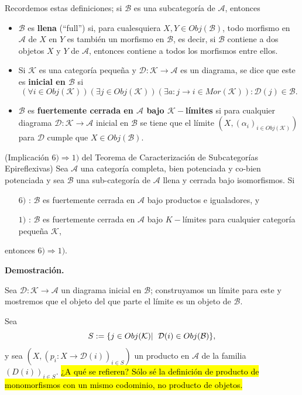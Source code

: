 \documentclass[10pt]{article}
\newtheorem[M]{teo}{Teorema}[section]
\newtheorem[M]{listaObj}[teo]{Lista de deseos}
\newtheorem[M]{preg}[teo]{Pregunta}
\newtheorem[M]{lema}[teo]{Lema}
\newtheorem[M]{hip}[teo]{Hipótesis}
\newtheorem[M]{prop}[teo]{Proposición}
\newtheorem[M]{obs}[teo]{Observación}
\newtheorem[M]{cor}[teo]{Corolario}
\newtheorem[M]{notacion}[teo]{Notación}
\newtheorem[M]{nota}[teo]{Nota}
\begin{document}
Recordemos estas definiciones;
si $\mathcal{B}$ es una
subcategoría de $\mathcal{A}$, entonces
\begin{itemize}
	\item $\mathcal{B}$ es \textbf{llena} (``full'') si, para cualesquiera
	$X, Y \in Obj(\mathcal{B})$, todo morfismo en 
	$\mathcal{A}$ de $X$ en $Y$ es también un morfismo en 
	$\mathcal{B}$, es decir, si $\mathcal{B}$ contiene a dos objetos
	$X$ y $Y$ de $\mathcal{A}$, entonces contiene a todos los morfismos
	entre ellos.
	\item Si $\mathcal{K}$ es una categoría pequeña y 
	$\mathcal{D}: \mathcal{K} \longrightarrow \mathcal{A}$ es un diagrama,
	se dice que este es \textbf{inicial en $\mathcal{B}$} si
	\[
	(\forall i \in Obj(\mathcal{K}))
	(\exists j \in Obj(\mathcal{K}))
	(\exists a: j \longrightarrow i \in Mor(\mathcal{K})):
	\mathcal{D}(j) \in \mathcal{B}.
	\]
	\item $\mathcal{B}$ es \textbf{fuertemente cerrada en 
	$\mathcal{A}$ bajo $\mathcal{K}-$límites} si 
	para cualquier diagrama 
	$\mathcal{D}: \mathcal{K} \longrightarrow \mathcal{A}$	
	inicial en $\mathcal{B}$ se tiene que el límite 
	$(X, (\alpha_{i})_{i \in Obj(\mathcal{K})})$ para 
	$\mathcal{D}$ cumple que $X \in Obj(\mathcal{B})$.
\end{itemize}

\begin{teo}
(Implicación $6) \Rightarrow 1)$ del Teorema de Caracterización de
Subcategorías Epireflexivas) Sea $\mathcal{A}$ una categoría 
completa, bien potenciada y co-bien potenciada y sea 
$\mathcal{B}$ una sub-categoría de $\mathcal{A}$
llena y cerrada bajo isomorfismos. Si
\begin{itemize}
	\item[$6)$]: $\mathcal{B}$ es fuertemente cerrada en 
	$\mathcal{A}$ bajo productos e igualadores, y
	\item[$1)$]: $\mathcal{B}$ es fuertemente cerrada en $\mathcal{A}$
	bajo $K-$límites para cualquier categoría pequeña $\mathcal{K}$,
\end{itemize}
entonces $6) \Rightarrow 1)$.
\end{teo}
\noindent
\textbf{Demostración.}

Sea $\mathcal{D}: \mathcal{K} \longrightarrow \mathcal{A}$
un diagrama inicial en $\mathcal{B}$; construyamos un límite para 
este y mostremos que el objeto del que parte el límite es 
un objeto de $\mathcal{B}$.

Sea 
\[
S := \{ j \in Obj(\mathcal{K}) | \hspace{0.2cm} 
\mathcal{D}(i) \in Obj(\mathcal{B}) \},
\]
y sea $(X, (p_{i}: X \longrightarrow \mathcal{D}(i))_{i \in S})$
un producto en $\mathcal{A}$ de la familia $(D(i))_{i \in S}$.
\hl{¿A qué se refieren? Sólo sé la definición de producto de monomorfismos
con un mismo codominio, no producto de objetos.}
\end{document}
